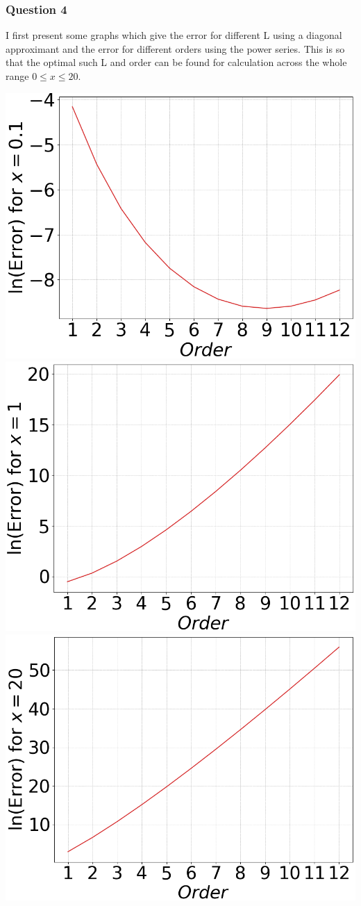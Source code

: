 \documentclass[12pt, a4paper]{article}
\begin{document}
\subsubsection*{Question 4}

I first present some graphs which give the error for different L using a diagonal approximant and
the error for different orders using the power series. This is so that the optimal such L and order
can be found for calculation across the whole range $0 \leq x \leq 20$.

\begin{minipage}{\textwidth}
	\centering
	\includegraphics[width=0.49\linewidth]{q4_series_x=0.1}
	\includegraphics[width=0.49\linewidth]{q4_series_x=1}
	\includegraphics[width=0.5\linewidth]{q4_series_x=20}
	\label{q4_series_change}
\end{minipage}
\vspace{0.5cm}
\end{document}
